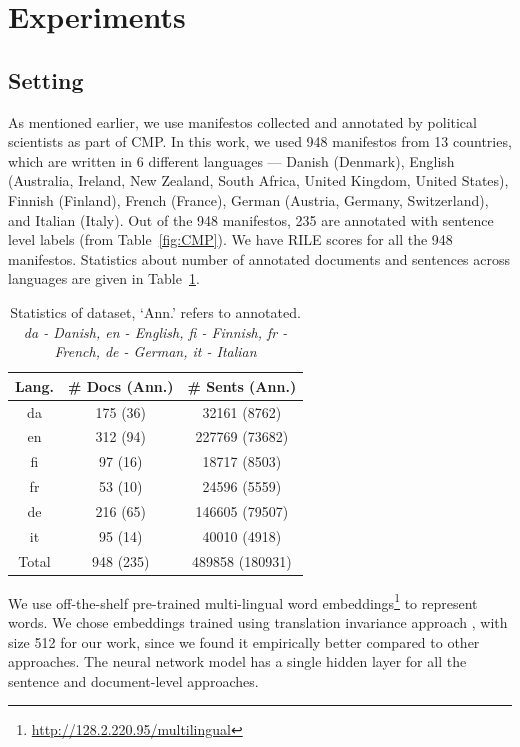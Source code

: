 \documentclass[11pt,a4paper]{article}
\newcommand{\tabref}[2][]{Table#1~\ref{#2}\xspace}
\begin{document}
\section{Experiments}
\subsection{Setting}
As mentioned earlier, we use manifestos collected and annotated by political scientists as part of CMP. In this work, we used 948 manifestos from 13 countries, which are written in 6 different languages --- Danish (Denmark), English (Australia, Ireland, New Zealand, South Africa, United Kingdom, United States), Finnish (Finland), French (France), German (Austria, Germany, Switzerland), and Italian (Italy). Out of the 948 manifestos, 235 are annotated with sentence level labels (from \tabref{fig:CMP}). We have RILE scores for all the 948 manifestos. Statistics about number of annotated documents and sentences across languages are given in \tabref{tab:al}.
 \begin{table}[!htp]
  \centering
  \begin{tabular}{ c c c }
  \toprule
    Lang. & \# Docs (Ann.) & \# Sents (Ann.)\\
    \midrule
    da  & 175 (36)  &  32161 (8762)	\\
    en   &  312 (94)& 227769 (73682) 	 \\    	
    fi  &  97 (16) &  18717 (8503) \\
    fr    & 53 (10) & 24596 (5559)\\
    de    & 216 (65) & 146605 (79507) \\
    it    & 95 (14)  & 40010 (4918)\\
\midrule
 Total    & 948 (235)  & 489858 (180931)\\
    \bottomrule

  \end{tabular}
  \caption{Statistics of dataset, `Ann.' refers to annotated. \textit{da - Danish, en - English, fi - Finnish, fr - French, de - German, it - Italian}}
  \label{tab:al}
\end{table}

We use off-the-shelf pre-trained multi-lingual word embeddings\footnote{\url{http://128.2.220.95/multilingual}} to represent words. We chose embeddings trained using translation invariance approach \cite{ammar2016massively}, with size 512 for our work, since we found it empirically better compared to other approaches. The neural network model has a single hidden layer for all the sentence and document-level approaches. 
\end{document}
